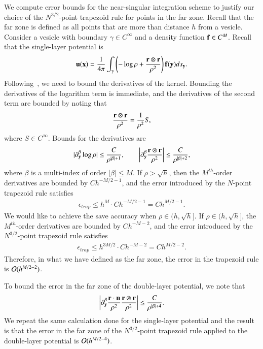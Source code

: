 We compute error bounds for the near-singular integration scheme to
justify our choice of the $N^{3/2}$-point trapezoid rule for points in
the far zone.  Recall that the far zone is defined as all points that
are more than distance $h$ from a vesicle.  Consider a vesicle with
boundary $\gamma \in C^{\infty}$ and a density function ${\mathbf{f}} \in
C^{M}$.  Recall that the single-layer potential is
\begin{align*}
  {\mathbf{u}}({\mathbf{x}}) = \frac{1}{4\pi} \int_{\gamma} \left(-\log \rho + 
    \frac{{\mathbf{r}} \otimes {\mathbf{r}}}{\rho^{2}}\right){\mathbf{f}}({\mathbf{y}}) ds_{{\mathbf{y}}}.
\end{align*}
Following~\cite{ying-biros-zorin06}, we need to bound the derivatives
of the kernel.  Bounding the derivatives of the logarithm term is
immediate, and the derivatives of the second term are bounded by noting
that
\begin{align*}
  \frac{{\mathbf{r}} \otimes {\mathbf{r}}}{\rho^{2}} = \frac{1}{\rho^{2}}S,
\end{align*}
where $S \in C^{\infty}$.  Bounds for the derivatives are
\begin{align*}
  |\partial^{\beta}_{{\mathbf{y}}} \log \rho| \leq \frac{C}{\rho^{|\beta|+1}},   
  \hspace{20pt}
  \left|\partial^{\beta}_{{\mathbf{y}}} \frac{{\mathbf{r}} \otimes {\mathbf{r}}}{\rho^{2}}\right| \leq
  \frac{C}{\rho^{|\beta|+2}},
\end{align*}
where $\beta$ is a multi-index of order $|\beta| \leq M$.  If $\rho >
\sqrt{h}$, then the $M^{th}$-order derivatives are bounded by
$Ch^{-M/2-1}$, and the error introduced by the $N$-point trapezoid rule
satisfies
\begin{align*}
  \epsilon_{trap} \leq h^{M} \cdot C h^{-M/2-1} = Ch^{M/2-1}.
\end{align*}
We would like to achieve the save accuracy when $\rho \in
(h,\sqrt{h}]$.  If $\rho \in (h,\sqrt{h}]$, the $M^{th}$-order
derivatives are bounded by $C h^{-M-2}$, and the error introduced by
the $N^{3/2}$-point trapezoid rule satisfies
\begin{align*}
  \epsilon_{trap} \leq h^{3M/2} \cdot C h^{-M-2} = Ch^{M/2-2}.
\end{align*}
Therefore, in what we have defined as the far zone, the error in the
trapezoid rule is $\mathcal{O}(h^{M/2-2})$.

To bound the error in the far zone of the double-layer potential, we note that
\begin{align*}
  \left|\partial^{\beta}_{{\mathbf{y}}} \frac{{\mathbf{r}} \cdot {\mathbf{n}}}{\rho^{2}}
    \frac{{\mathbf{r}} \otimes {\mathbf{r}}}{\rho^{2}}\right| \leq \frac{C}{\rho^{|\beta|+4}}.
\end{align*}
We repeat the same calculation done for the single-layer potential and
the result is that the error in the far zone of the $N^{3/2}$-point
trapezoid rule applied to the double-layer potential is
$\mathcal{O}(h^{M/2-4})$.

